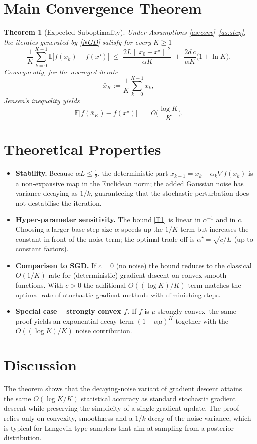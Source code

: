 \documentclass{article}
\newtheorem{theorem}{Theorem}
\newcommand{\E}{\mathbb{E}}
\newcommand{\norm}[1]{\left\lVert #1\right\rVert}
\begin{document}
\section*{Main Convergence Theorem}
\begin{theorem}[Expected Suboptimality]\label{thm:main}
Under Assumptions \ref{as:conv}–\ref{as:step}, the iterates generated by \eqref{NGD} satisfy for every $K\ge 1$
\[
\frac{1}{K}\sum_{k=0}^{K-1}\E\!\big[f(x_k)-f(x^\star)\big]
\;\le\;
\frac{2L\norm{x_0-x^\star}^{2}}{\alpha K}
\;+\;
\frac{2d\,c}{\alpha K}\bigl(1+\ln K\bigr).
\tag{T1}
\]
Consequently, for the averaged iterate
\[
\bar x_K:=\frac{1}{K}\sum_{k=0}^{K-1}x_k ,
\]
Jensen’s inequality yields
\[
\E\!\big[f(\bar x_K)-f(x^\star)\big]\;=\;O\!\Big(\frac{\log K}{K}\Big).
\tag{T2}
\]
\end{theorem}

\section*{Theoretical Properties}
\begin{itemize}
\item \textbf{Stability.} Because $\alpha L\le\frac12$, the deterministic part $x_{k+1}=x_k-\alpha_k\nabla f(x_k)$ is a non‑expansive map in the Euclidean norm; the added Gaussian noise has variance decaying as $1/k$, guaranteeing that the stochastic perturbation does not destabilise the iteration.
\item \textbf{Hyper‑parameter sensitivity.} The bound \eqref{T1} is linear in $\alpha^{-1}$ and in $c$. Choosing a larger base step size $\alpha$ speeds up the $1/K$ term but increases the constant in front of the noise term; the optimal trade‑off is $\alpha^\star=\sqrt{c/L}$ (up to constant factors).
\item \textbf{Comparison to SGD.} If $c=0$ (no noise) the bound reduces to the classical $O(1/K)$ rate for (deterministic) gradient descent on convex smooth functions. With $c>0$ the additional $O((\log K)/K)$ term matches the optimal rate of stochastic gradient methods with diminishing steps.
\item \textbf{Special case – strongly convex $f$.} If $f$ is $\mu$‑strongly convex, the same proof yields an exponential decay term $ (1-\alpha\mu)^{K}$ together with the $O((\log K)/K)$ noise contribution.
\end{itemize}

\section*{Discussion}
The theorem shows that the decaying‑noise variant of gradient descent attains the same $O(\log K/K)$ statistical accuracy as standard stochastic gradient descent while preserving the simplicity of a single‑gradient update. The proof relies only on convexity, smoothness and a $1/k$ decay of the noise variance, which is typical for Langevin‑type samplers that aim at sampling from a posterior distribution.
\end{document}
